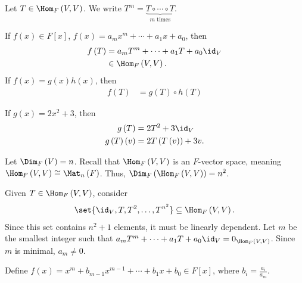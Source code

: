 \documentclass[10pt]{mypackage}
\begin{document}
\begin{notation}
  Let $T\in \Hom_{F}\left(V,V\right)$. We write $T^m = \underbrace{T\circ \cdots \circ T}_{m\text{ times}}$.\newline

  If $f(x) \in F[x]$, $f(x) = a_mx^m + \cdots + a_1 x + a_0$, then
  \begin{align*}
    f\left(T\right) &= a_mT^m + \cdots + a_1T + a_0 \id_V\\
                    &\in \Hom_{F}\left(V,V\right).
  \end{align*}
  If $f(x) = g(x)h(x)$, then
  \begin{align*}
    f(T) &= g(T)\circ h(T)
  \end{align*}
\end{notation}
\begin{example}
  If $g(x) = 2x^2 + 3$, then
  \begin{align*}
    g\left(T\right) &= 2T^2 + 3\id_V\\
    g\left(T\right)\left(v\right) &= 2T\left(T\left(v\right)\right) + 3v.
  \end{align*}
\end{example}
Let $\Dim_{F}\left(V\right) = n$. Recall that $\Hom_{F}\left(V,V\right)$ is an $F$-vector space, meaning $\Hom_{F}\left(V,V\right) \cong \Mat_{n}\left(F\right)$. Thus, $\Dim_{F}\left(\Hom_{F}\left(V,V\right)\right) = n^2$.\newline

Given $T\in \Hom_{F}\left(V,V\right)$, consider
\begin{align*}
  \set{\id_V,T,T^2,\dots,T^{n^2}}\subseteq \Hom_{F}\left(V,V\right).
\end{align*}
Since this set contains $n^2 + 1$ elements, it must be linearly dependent. Let $m$ be the smallest integer such that $a_m T^{m} + \cdots + a_1 T + a_0\id_V = 0_{\Hom_{F}\left(V,V\right)}$. Since $m$ is minimal, $a_m \neq 0$.\newline

Define $f(x) = x^m + b_{m-1}x^{m-1} + \cdots + b_1 x + b_0\in F[x]$, where $b_i = \frac{a_i}{a_m}$.\newline
\end{document}
